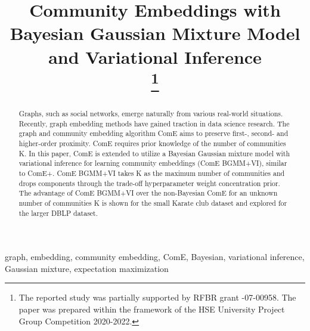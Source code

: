 \documentclass[conference]{IEEEtran}
\begin{document}
\title{Community Embeddings with Bayesian Gaussian Mixture Model and Variational Inference\\
    \thanks{The reported study was partially supported by RFBR grant -07-00958. The paper was prepared within the framework of the HSE University Project Group Competition 2020-2022.}
}

\author{
    \and
}

\maketitle

\begin{abstract}
    Graphs, such as social networks, emerge naturally from various real-world situations. Recently, graph embedding methods have gained traction in data science research.
    The graph and community embedding algorithm ComE aims to preserve first-, second- and higher-order proximity. ComE requires prior knowledge of the number of communities K. In this paper, ComE is extended to utilize a Bayesian Gaussian mixture model with variational inference for learning community embeddings (ComE BGMM+VI), similar to ComE+. ComE BGMM+VI takes K as the maximum number of communities and drops components through the trade-off hyperparameter weight concentration prior.
    The advantage of ComE BGMM+VI over the non-Bayesian ComE for an unknown number of communities K is shown for the small Karate club dataset and explored for the larger DBLP dataset.
\end{abstract}

\begin{IEEEkeywords}
    graph, embedding, community embedding, ComE, Bayesian, variational inference, Gaussian mixture, expectation maximization
\end{IEEEkeywords}
\end{document}
